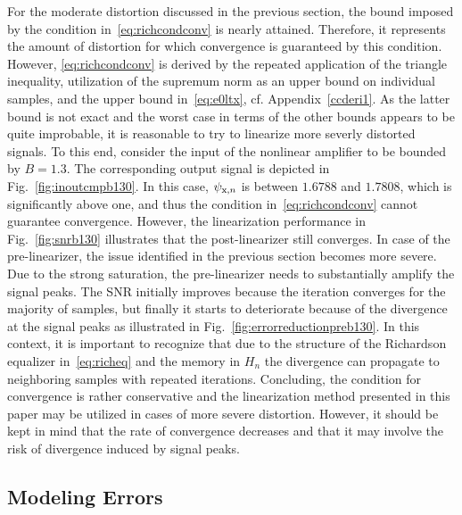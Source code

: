 \documentclass[10pt,twocolumn,twoside]{IEEEtran}
\begin{document}
For the moderate distortion discussed in the previous section, the bound
imposed by the condition in~\eqref{eq:richcondconv} is nearly attained.
Therefore, it represents the amount of distortion for which convergence
is guaranteed by this condition. However, \eqref{eq:richcondconv} is derived
by the repeated application of the triangle inequality, utilization of the
supremum norm as an upper bound on individual samples, and the upper bound
in~\eqref{eq:e0ltx}, cf. Appendix~\ref{ccderi1}. As the latter bound is not
exact and the worst case in terms of the other bounds appears to be quite
improbable, it is reasonable to try to linearize more severly distorted signals.
To this end, consider the input of the nonlinear amplifier to be bounded by $B=1.3$.
The corresponding output signal is depicted in Fig.~\ref{fig:inoutcmpb130}.
In this case, $\psi_{\mathrm{x},n}$ is between $1.6788$ and $1.7808$, which is
significantly above one, and thus the condition in~\eqref{eq:richcondconv}
cannot guarantee convergence.
However, the linearization performance in Fig.~\ref{fig:snrb130} illustrates that
the post-linearizer still converges. In case of the pre-linearizer, the issue identified
in the previous section becomes more severe. Due to the strong saturation, the pre-linearizer
needs to substantially amplify the signal peaks. The SNR initially improves because the
iteration converges for the majority of samples, but finally it starts to deteriorate
because of the divergence at the signal peaks as illustrated in Fig.~\ref{fig:errorreductionpreb130}.
In this context, it is important to recognize that due to the structure of the Richardson
equalizer in~\eqref{eq:richeq} and the memory in $H_n$ the divergence can propagate to
neighboring samples with repeated iterations.
Concluding, the condition for convergence is rather conservative and the linearization
method presented in this paper may be utilized in cases of more severe distortion. However,
it should be kept in mind that the rate of convergence decreases and that
it may involve the risk of divergence induced by signal peaks.


\subsection{Modeling Errors}
\end{document}

